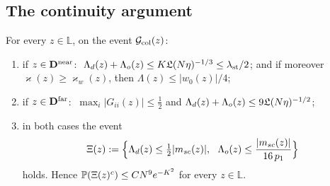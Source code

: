 \subsection{The continuity argument}
\begin{theorem}\label{thm:weak}
For every $z\in\mathbb L$, on the event $\mathcal{G}_{\rm col}(z)$:
\begin{enumerate}[label=\textup{(\alph*)},leftmargin=2.2em,itemsep=0pt]
\item if $z\in\mathbf{D}^{\rm near}$: $\ \Lambda_d(z)+\Lambda_o(z)\le K\mathfrak{L}(N\eta)^{-1/3}\le\lambda_{\rm st}/2$; and if moreover $\varkappa(z)\ge\varkappa_w(z)$, then $\Lambda(z)\le|w_0(z)|/4$;
\item if $z\in\mathbf{D}^{\rm far}$: $\ \max_i|G_{ii}(z)|\le\frac12$ and $\Lambda_d(z)+\Lambda_o(z)\le9\mathfrak{L}(N\eta)^{-1/2}$;
\item in both cases the event
\begin{equation}\label{eq:Xiev}
 \Xi(z):=\Big\{\Ld(z)\le\tfrac12|\msc(z)|,\ \ \Lo(z)\le\frac{|\msc(z)|}{16\,p_1}\Big\}
\end{equation}
holds. Hence $\mathbb{P}(\Xi(z)^c)\le CN^9e^{-K^2}$ for every $z\in\mathbb L$.
\end{enumerate}
\end{theorem}

